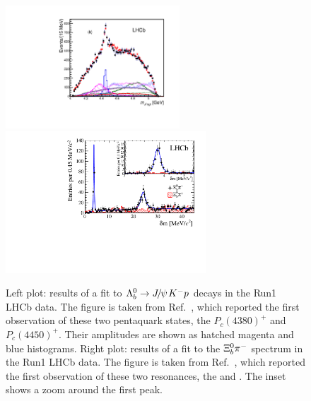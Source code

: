 

\begin{figure}[h]
\begin{center}
\includegraphics[width=6.5cm]{mjpsip-default.pdf} 
\includegraphics[width=7.5cm]{paperPlot-merged.pdf}
\end{center}
\caption{Left plot: results of a fit to ${{\Lambda}^0_{b}} \rightarrow {\ensuremath{{J\mskip -3mu/\mskip -2mu\psi\mskip 2mu}}} {\ensuremath{{K}^-}} {\ensuremath{p}}$ decays in the Run1 LHCb data. The figure is taken from Ref.~\cite{Aaij:2015tga}, which reported the first observation of these two pentaquark states, the $P_c(4380)^+$ and $P_c(4450)^+$. Their amplitudes are shown as hatched magenta and blue histograms.  Right plot: results of a fit to the ${{\Xi}^0_{b}} {{\pi}^-}$ spectrum in the Run1 LHCb data. The figure is taken from Ref.~\cite{Aaij:2014yka}, which reported the first observation of these two resonances, the \XibPrimeMinus and \XibStarMinus. The inset shows a zoom around the first peak.}%
\label{figspect}%
\end{figure}




